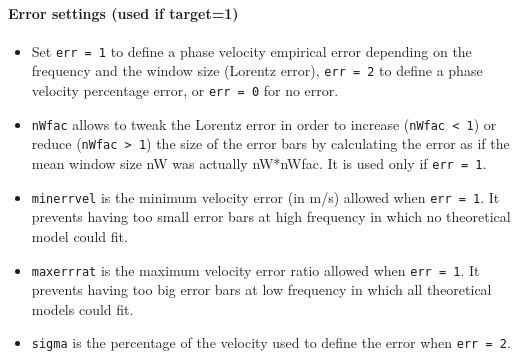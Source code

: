 \documentclass[twoside,a4paper]{article}
\begin{document}
\paragraph{Error settings (used if target=1)}
\begin{itemize}
\setlength\itemsep{2ex}
\setlength{\parindent}{5ex}

\item Set \verb|err = 1| to define a phase velocity empirical error depending on the frequency and the window size (Lorentz error), \verb|err = 2| to define a phase velocity percentage error, or \verb|err = 0| for no error.

\item \verb|nWfac| allows to tweak the Lorentz error in order to increase (\verb|nWfac < 1|) or reduce (\verb|nWfac > 1|) the size of the error bars by calculating the error as if the mean window size nW was actually nW*nWfac. It is used only if \verb|err = 1|.

\item \verb|minerrvel| is the minimum velocity error (in m/s) allowed when \verb|err = 1|. It prevents having too small error bars at high frequency in which no theoretical model could fit.

\item \verb|maxerrrat| is the maximum velocity error ratio allowed when \verb|err = 1|. It prevents having too big error bars at low frequency in which all theoretical models could fit.

\item \verb|sigma| is the percentage of the velocity used to define the error when \verb|err = 2|.

\end{itemize}
\end{document}
